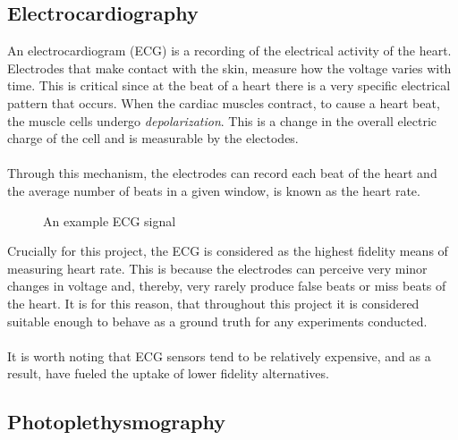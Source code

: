 \subsection{Electrocardiography}
An electrocardiogram (ECG) is a recording of the electrical activity of the heart. Electrodes that make contact with the skin, measure how the voltage varies with time.
This is critical since at the beat of a heart there is a very specific electrical pattern that occurs. When the cardiac muscles contract, to cause a heart beat, the muscle cells undergo
\textit{depolarization}. This is a change in the overall electric charge of the cell and is measurable by the electodes. \\\\
Through this mechanism, the electrodes can record each beat of the heart and the average number of beats in a given window, is known as the heart rate.
\begin{figure}[H]
    \centering
    
   \caption{An example ECG signal} 
\end{figure}
\noindent
Crucially for this project, the ECG is considered as the highest fidelity means of measuring heart rate. This is because the electrodes can perceive very minor changes in voltage and, thereby, very rarely produce false beats or miss beats of the heart. It is for this reason, that throughout this project it is considered suitable enough to behave as a ground truth for any experiments conducted.
\\\\
It is worth noting that ECG sensors tend to be relatively expensive, and as a result, have fueled the uptake of lower fidelity alternatives.

\subsection{Photoplethysmography}

